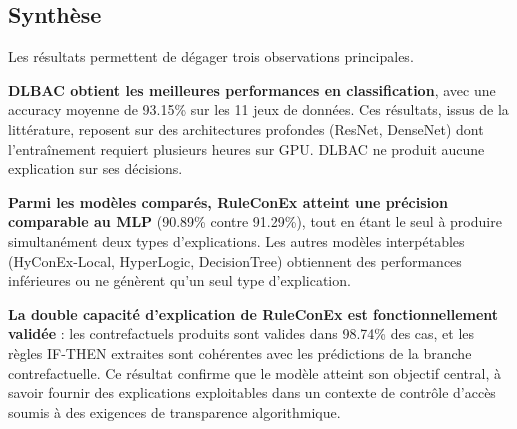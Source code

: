 \documentclass[12pt,a4paper]{article}
\begin{document}
\subsection{Synthèse}
\label{sec:synthese_resultats}

Les résultats permettent de dégager trois observations principales.

\textbf{DLBAC obtient les meilleures performances en classification}, avec une
accuracy moyenne de 93.15\% sur les 11 jeux de données. Ces résultats, issus
de la littérature, reposent sur des architectures profondes (ResNet, DenseNet)
dont l'entraînement requiert plusieurs heures sur GPU. DLBAC ne produit aucune
explication sur ses décisions.

\textbf{Parmi les modèles comparés, RuleConEx atteint une précision comparable
au MLP} (90.89\% contre 91.29\%), tout en étant le seul à produire simultanément
deux types d'explications. Les autres modèles interpétables (HyConEx-Local,
HyperLogic, DecisionTree) obtiennent des performances inférieures ou ne génèrent
qu'un seul type d'explication.

\textbf{La double capacité d'explication de RuleConEx est fonctionnellement
validée} : les contrefactuels produits sont valides dans 98.74\% des cas, et
les règles IF-THEN extraites sont cohérentes avec les prédictions de la branche
contrefactuelle. Ce résultat confirme que le modèle atteint son objectif central,
à savoir fournir des explications exploitables dans un contexte de contrôle
d'accès soumis à des exigences de transparence algorithmique.



\end{document}
